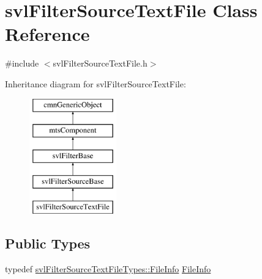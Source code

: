 \hypertarget{classsvl_filter_source_text_file}{}\section{svl\+Filter\+Source\+Text\+File Class Reference}
\label{classsvl_filter_source_text_file}


{\ttfamily \#include $<$svl\+Filter\+Source\+Text\+File.\+h$>$}

Inheritance diagram for svl\+Filter\+Source\+Text\+File\+:\begin{figure}[H]
\begin{center}
\leavevmode
\includegraphics[height=5.000000cm]{de/d87/classsvl_filter_source_text_file}
\end{center}
\end{figure}
\subsection*{Public Types}
\begin{DoxyCompactItemize}
\item 
typedef \hyperlink{classsvl_filter_source_text_file_types_1_1_file_info}{svl\+Filter\+Source\+Text\+File\+Types\+::\+File\+Info} \hyperlink{classsvl_filter_source_text_file_a84944643e5cff813e434ffcdb29be62d}{File\+Info}
\end{DoxyCompactItemize}
